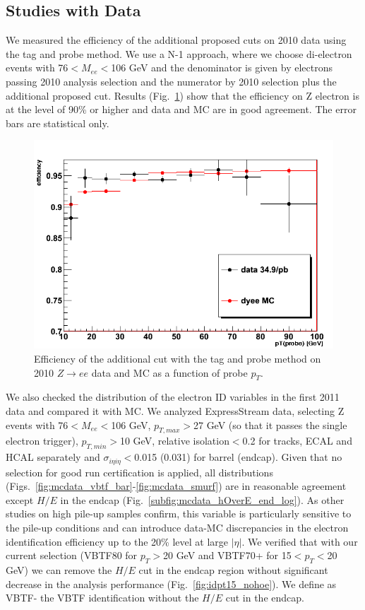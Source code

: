 \subsection{Studies with Data}

We measured the efficiency of the additional proposed cuts on 2010 data using the tag and probe method.
We use a N-1 approach, where we choose di-electron events with 76$<M_{ee}<$106 GeV and the denominator is given by electrons passing 2010 analysis selection
and the numerator by 2010 selection plus the additional proposed cut. 
Results (Fig.~\ref{fig:eID-tnp}) show that the efficiency on Z electron is at the level of 90\%
or higher and data and MC are in good agreement. The error bars are statistical only.

\begin{figure}[!hbtp]
\centering
\includegraphics[width=.45\textwidth]{figures/eID-tnp.png}
\caption{Efficiency of the additional cut with the tag and probe method on 2010 $Z\rightarrow ee$ data and MC as a function of probe $p_T$.}
\label{fig:eID-tnp}
\end{figure}

We also checked the distribution of the electron ID variables in the first 2011 data and compared it with MC.
We analyzed ExpressStream data, selecting Z events with 76$<M_{ee}<$106 GeV, $p_{T,max}>$27 GeV (so that it passes the single electron trigger), 
$p_{T,min}>$10 GeV, relative isolation$<$0.2 for tracks, ECAL and HCAL separately and $\sigma_{i\eta i\eta}<$0.015 (0.031) for barrel (endcap).
Given that no selection for good run certification is applied, all distributions (Figs.~\ref{fig:mcdata_vbtf_bar}-\ref{fig:mcdata_smurf}) 
are in reasonable agreement except $H/E$ in the endcap (Fig.~\ref{subfig:mcdata_hOverE_end_log}). 
As other studies on high pile-up samples confirm, this variable is particularly sensitive to the pile-up conditions and can introduce data-MC discrepancies 
in the electron identification efficiency up to the 20\% level at large $|\eta|$.
We verified that with our current selection (VBTF80 for $p_T>$20 GeV and VBTF70+ for 15$<p_T<$20 GeV) we can remove the $H/E$ cut in the endcap
region without significant decrease in the analysis performance (Fig.~\ref{fig:idpt15_nohoe}). We define as VBTF- the VBTF identification without the $H/E$ cut in the endcap.

